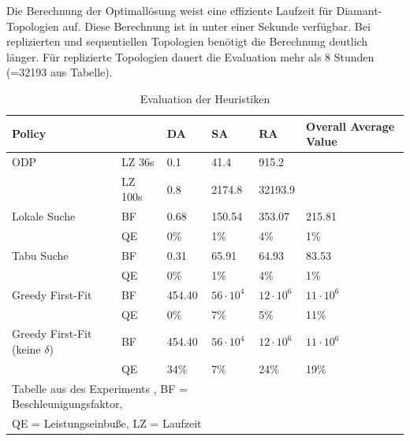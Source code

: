 \documentclass{article}
\begin{document}
Die Berechnung der Optimallösung weist eine effiziente Laufzeit für Diamant-Topologien auf. 
Diese Berechnung ist in unter einer Sekunde verfügbar. Bei replizierten und sequentiellen Topologien benötigt die Berechnung deutlich länger. 
Für replizierte Topologien dauert die Evaluation mehr als 8 Stunden (=32193 aus Tabelle). \\
\begin{table}[htbp]  
    \centering
    \caption{Evaluation der Heuristiken}
    \begin{tabular}{llllll}
    \toprule
    Policy                           &       & DA        & SA              & RA                & Overall Average Value                  \\
    \midrule
    ODP                              &LZ 36s &  0.1      & 41.4             & 915.2            &                  \\
                                     &LZ 100s&  0.8      & 2174.8           & 32193.9          &                  \\
    \cmidrule{1-5}
    Lokale Suche                     &BF     &  0.68     & 150.54           & 353.07           & 215.81           \\
                                     &QE     &0\%        & 1\%              &4\%               & 1\%              \\
    Tabu Suche                       &BF     &  0.31     & 65.91            & 64.93            & 83.53            \\
                                     &QE     &0\%        & 1\%              &4\%               & 1\%              \\           
    Greedy First-Fit                 &BF     &  454.40   & $56 \cdot 10^4$  & $12 \cdot 10^6$  & $11 \cdot 10^6$  \\
                                     &QE     &0\%        & 7\%              &5\%               &11\%              \\
    Greedy First-Fit (keine $\delta$)&BF     &  454.40   & $56 \cdot 10^4$  & $12 \cdot 10^6$  & $11 \cdot 10^6$  \\
                                     &QE     &34\%       & 7\%              &24\%              & 19\%             \\
    \bottomrule
    \multicolumn{4}{l}{\footnotesize Tabelle aus des Experiments \cite{efficient-operator-placement}, BF = Beschleunigungsfaktor,}\\
    \multicolumn{4}{l}{\footnotesize QE = Leistungseinbuße, LZ = Laufzeit}\\
    \end{tabular}
    \label{experiment-tabelle}
\end{table} 
\end{document}
